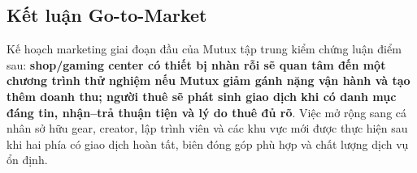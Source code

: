 \subsection{Kết luận Go-to-Market}

Kế hoạch marketing giai đoạn đầu của Mutux tập trung kiểm chứng luận điểm sau: \textbf{shop/gaming center có thiết bị nhàn rỗi sẽ quan tâm đến một chương trình thử nghiệm nếu Mutux giảm gánh nặng vận hành và tạo thêm doanh thu; người thuê sẽ phát sinh giao dịch khi có danh mục đáng tin, nhận--trả thuận tiện và lý do thuê đủ rõ}. Việc mở rộng sang cá nhân sở hữu gear, creator, lập trình viên và các khu vực mới được thực hiện sau khi hai phía có giao dịch hoàn tất, biên đóng góp phù hợp và chất lượng dịch vụ ổn định.
